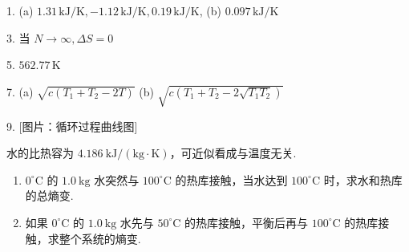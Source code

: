 \begin{oddanswers}
1. (a) $1.31\,\mathrm{kJ/K}, -1.12\,\mathrm{kJ/K}, 0.19\,\mathrm{kJ/K}$,
(b) $0.097\,\mathrm{kJ/K}$

3. 当 $N \to \infty, \Delta S = 0$

5. $562.77\,\mathrm{K}$

7. (a) $\sqrt{c(T_1 + T_2 - 2T)}$
(b) $\sqrt{c(T_1 + T_2 - 2\sqrt{T_1 T_2})}$

9. [图片：循环过程曲线图]
\end{oddanswers}

\begin{exercise}\label{ex:12.1}
水的比热容为 $4.186 \ \mathrm{kJ/(kg \cdot K)}$，可近似看成与温度无关.
\begin{enumerate}
  \item[(a)] $0^\circ\mathrm{C}$ 的 $1.0 \ \mathrm{kg}$ 水突然与 $100^\circ\mathrm{C}$ 的热库接触，当水达到 $100^\circ\mathrm{C}$ 时，求水和热库的总熵变.
  \item[(b)] 如果 $0^\circ\mathrm{C}$ 的 $1.0 \ \mathrm{kg}$ 水先与 $50^\circ\mathrm{C}$ 的热库接触，平衡后再与 $100^\circ\mathrm{C}$ 的热库接触，求整个系统的熵变.
\end{enumerate}
\end{exercise}
